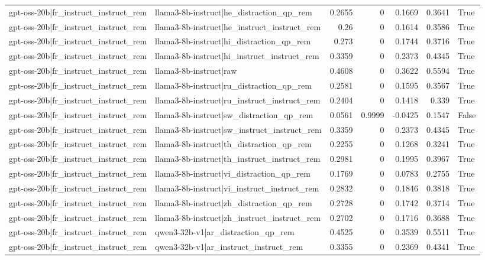 \begin{table}
\begin{tabular}{l l r r r r l}
gpt-oss-20b|fr_instruct_instruct_rem & llama3-8b-instruct|he_distraction_qp_rem & 0.2655 & 0 & 0.1669 & 0.3641 & True \\
gpt-oss-20b|fr_instruct_instruct_rem & llama3-8b-instruct|he_instruct_instruct_rem & 0.26 & 0 & 0.1614 & 0.3586 & True \\
gpt-oss-20b|fr_instruct_instruct_rem & llama3-8b-instruct|hi_distraction_qp_rem & 0.273 & 0 & 0.1744 & 0.3716 & True \\
gpt-oss-20b|fr_instruct_instruct_rem & llama3-8b-instruct|hi_instruct_instruct_rem & 0.3359 & 0 & 0.2373 & 0.4345 & True \\
gpt-oss-20b|fr_instruct_instruct_rem & llama3-8b-instruct|raw & 0.4608 & 0 & 0.3622 & 0.5594 & True \\
gpt-oss-20b|fr_instruct_instruct_rem & llama3-8b-instruct|ru_distraction_qp_rem & 0.2581 & 0 & 0.1595 & 0.3567 & True \\
gpt-oss-20b|fr_instruct_instruct_rem & llama3-8b-instruct|ru_instruct_instruct_rem & 0.2404 & 0 & 0.1418 & 0.339 & True \\
gpt-oss-20b|fr_instruct_instruct_rem & llama3-8b-instruct|sw_distraction_qp_rem & 0.0561 & 0.9999 & -0.0425 & 0.1547 & False \\
gpt-oss-20b|fr_instruct_instruct_rem & llama3-8b-instruct|sw_instruct_instruct_rem & 0.3359 & 0 & 0.2373 & 0.4345 & True \\
gpt-oss-20b|fr_instruct_instruct_rem & llama3-8b-instruct|th_distraction_qp_rem & 0.2255 & 0 & 0.1268 & 0.3241 & True \\
gpt-oss-20b|fr_instruct_instruct_rem & llama3-8b-instruct|th_instruct_instruct_rem & 0.2981 & 0 & 0.1995 & 0.3967 & True \\
gpt-oss-20b|fr_instruct_instruct_rem & llama3-8b-instruct|vi_distraction_qp_rem & 0.1769 & 0 & 0.0783 & 0.2755 & True \\
gpt-oss-20b|fr_instruct_instruct_rem & llama3-8b-instruct|vi_instruct_instruct_rem & 0.2832 & 0 & 0.1846 & 0.3818 & True \\
gpt-oss-20b|fr_instruct_instruct_rem & llama3-8b-instruct|zh_distraction_qp_rem & 0.2728 & 0 & 0.1742 & 0.3714 & True \\
gpt-oss-20b|fr_instruct_instruct_rem & llama3-8b-instruct|zh_instruct_instruct_rem & 0.2702 & 0 & 0.1716 & 0.3688 & True \\
gpt-oss-20b|fr_instruct_instruct_rem & qwen3-32b-v1|ar_distraction_qp_rem & 0.4525 & 0 & 0.3539 & 0.5511 & True \\
gpt-oss-20b|fr_instruct_instruct_rem & qwen3-32b-v1|ar_instruct_instruct_rem & 0.3355 & 0 & 0.2369 & 0.4341 & True \\

\end{tabular}
\end{table}

